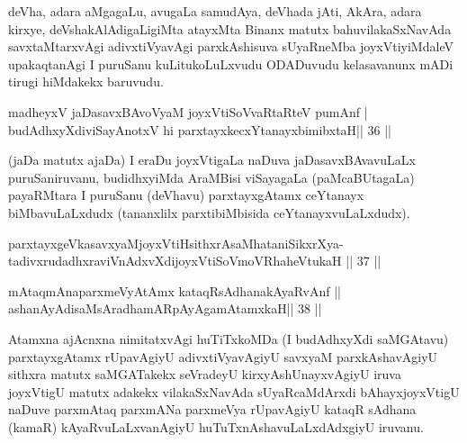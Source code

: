 \begin{artha}
deVha, adara aMgagaLu, avugaLa samudAya, deVhada jAti, AkAra, adara kirxye, deVshakAlAdigaLigiMta atayxMta Binanx matutx bahuvilakaSxNavAda savxtaMtarxvAgi adivxtiVyavAgi parxkAshisuva sUyaRneMba joyxVtiyiMdaleV upakaqtanAgi I puruSanu kuLitukoLuLxvudu ODADuvudu kelasavanunx mADi tirugi hiMdakekx baruvudu.
\end{artha}



\begin{shl}
madheyxV jaDasavxBAvoV\s yaM joyxVtiSoVvaRtaRteV pumAnf | \\
budAdhxyXdiviSayAnotxV hi parxtayxkecxYtanayxbimibxtaH\hfill ||  36 ||  
\end{shl}

\begin{artha}
(jaDa matutx ajaDa) I eraDu joyxVtigaLa naDuva jaDasavxBAvavuLaLx puruSaniruvanu, budidhxyiMda AraMBisi viSayagaLa (paMcaBUtagaLa) payaRMtara I puruSanu (deVhavu) parxtayxgAtamx ceYtanayx biMbavuLaLxdudx (tananxlilx parxtibiMbisida ceYtanayxvuLaLxdudx).
\end{artha}


\begin{shl}
parxtayxgeVkasavxyaMjoyxVtiHsithxrAsaMhataniSikxrXya-\\
tadivxrudadhxraviVnAdxvXdijoyxVtiSoVmoVRhaheVtukaH \hfill||  37 ||  
\end{shl}
				
\begin{shl}
mAtaqmAnaparxmeVyAtAmx kataqRsAdhanakAyaRvAnf ||  \\
ashanAyAdisaMsAradhamARpAyAgamAtamxkaH\hfill ||  38 || 
\end{shl}

\begin{artha}
Atamxna ajAcnxna nimitatxvAgi huTiTxkoMDa (I budAdhxyXdi saMGAtavu) parxtayxgAtamx rUpavAgiyU adivxtiVyavAgiyU savxyaM parxkAshavAgiyU sithxra matutx saMGATakekx seVradeyU kirxyAshUnayxvAgiyU iruva joyxVtigU matutx adakekx vilakaSxNavAda sUyaRcaMdArxdi bAhayxjoyxVtigU naDuve parxmAtaq parxmANa parxmeVya rUpavAgiyU kataqR sAdhana (kamaR) kAyaRvuLaLxvanAgiyU huTuTxnAshavuLaLxdAdxgiyU iruvanu.
\end{artha}



